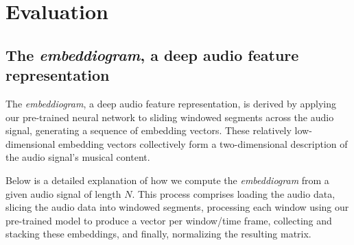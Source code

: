 \chapter{Evaluation}

\section{The \textit{embeddiogram}, a deep audio feature representation}

The \textit{embeddiogram}, a deep audio feature representation, is derived by applying our pre-trained neural network to sliding windowed segments across the audio signal, generating a sequence of embedding vectors. These relatively low-dimensional embedding vectors collectively form a two-dimensional description of the audio signal's musical content.

Below is a detailed explanation of how we compute the \textit{embeddiogram} from a given audio signal of length $N$. This process comprises loading the audio data, slicing the audio data into windowed segments, processing each window using our pre-trained model to produce a vector per window/time frame, collecting and stacking these embeddings, and finally, normalizing the resulting matrix. 

